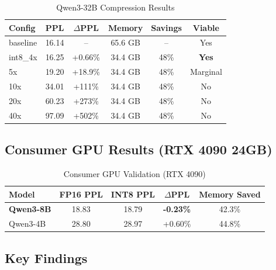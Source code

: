 \documentclass[11pt]{article}
\begin{document}
\begin{table}[h]
\centering
\caption{Qwen3-32B Compression Results}
\label{tab:qwen3-32b}
\begin{tabular}{@{}lccccc@{}}
\toprule
Config & PPL & $\Delta$PPL & Memory & Savings & Viable \\
\midrule
baseline & 16.14 & -- & 65.6 GB & -- & Yes \\
int8\_4x & 16.25 & +0.66\% & 34.4 GB & 48\% & \textbf{Yes} \\
5x & 19.20 & +18.9\% & 34.4 GB & 48\% & Marginal \\
10x & 34.01 & +111\% & 34.4 GB & 48\% & No \\
20x & 60.23 & +273\% & 34.4 GB & 48\% & No \\
40x & 97.09 & +502\% & 34.4 GB & 48\% & No \\
\bottomrule
\end{tabular}
\end{table}

\subsection{Consumer GPU Results (RTX 4090 24GB)}

\begin{table}[h]
\centering
\caption{Consumer GPU Validation (RTX 4090)}
\begin{tabular}{@{}lcccc@{}}
\toprule
Model & FP16 PPL & INT8 PPL & $\Delta$PPL & Memory Saved \\
\midrule
\textbf{Qwen3-8B} & 18.83 & 18.79 & \textbf{-0.23\%} & 42.3\% \\
Qwen3-4B & 28.80 & 28.97 & +0.60\% & 44.8\% \\
\bottomrule
\end{tabular}
\end{table}

\subsection{Key Findings}
\end{document}
